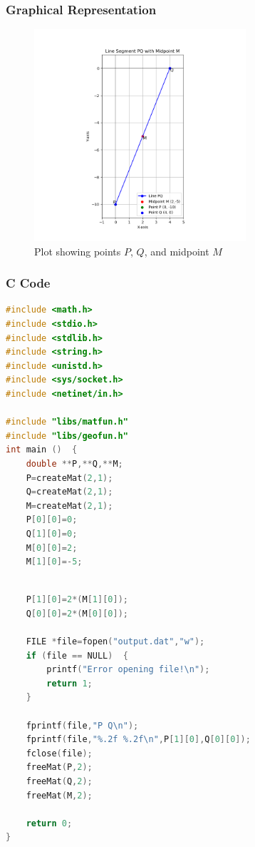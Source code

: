 \documentclass{beamer}
\theoremstyle{remark}
\begin{document}
\begin{frame}
\frametitle{Graphical Representation}
\begin{figure}[h!]
\centering
\includegraphics[width=0.7\textwidth]{Figure_1.png}
\caption{Plot showing points $ P $, $ Q $, and midpoint $ M $}
\label{fig:graph}
\end{figure}
\end{frame}

\begin{frame}[fragile]
\frametitle{C Code}
\begin{lstlisting}[language=C, basicstyle=\ttfamily\small, keywordstyle=\color{blue}]
#include <math.h>
#include <stdio.h>
#include <stdlib.h>
#include <string.h>
#include <unistd.h>
#include <sys/socket.h>
#include <netinet/in.h>

#include "libs/matfun.h"
#include "libs/geofun.h"
int main ()  {
    double **P,**Q,**M;
    P=createMat(2,1);
    Q=createMat(2,1);
    M=createMat(2,1);
    P[0][0]=0;        
    Q[1][0]=0;
    M[0][0]=2;
    M[1][0]=-5;

\end{lstlisting}
\end{frame}

\begin{frame}[fragile]

\begin{lstlisting}[language=C, basicstyle=\ttfamily\small, keywordstyle=\color{blue}]

    P[1][0]=2*(M[1][0]);
    Q[0][0]=2*(M[0][0]);

    FILE *file=fopen("output.dat","w");
    if (file == NULL)  {
        printf("Error opening file!\n");
        return 1;
    }

    fprintf(file,"P Q\n");
    fprintf(file,"%.2f %.2f\n",P[1][0],Q[0][0]);
    fclose(file);
    freeMat(P,2);
    freeMat(Q,2);
    freeMat(M,2);

    return 0;
}
\end{lstlisting}
\end{frame}
\end{document}
